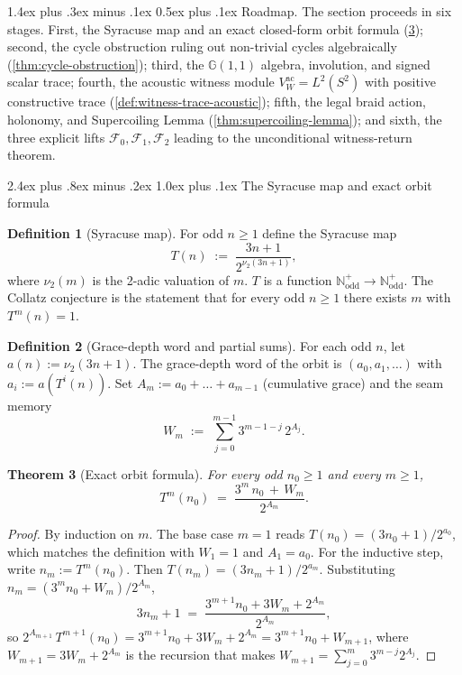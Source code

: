 \documentclass[11pt,a4paper]{article}
\makeatletter
\theoremstyle{plain}
\newtheorem{theorem}{Theorem}[section]
\theoremstyle{definition}
\newtheorem{definition}[theorem]{Definition}
\theoremstyle{remark}
\numberwithin{equation}{section}
\newcommand{\Cl}{\mathbb{G}}
\newcommand{\Nat}{\mathbb{N}}
\renewcommand{\subsection}{%
  \@startsection{subsection}{2}{0pt}%
    {2.4ex plus .8ex minus .2ex}%
    {1.0ex plus .1ex}%
    {\normalfont\Large\bfseries\color{headingAccent}}%
}
\renewcommand{\paragraph}{%
  \@startsection{paragraph}{4}{0pt}%
    {1.4ex plus .3ex minus .1ex}%
    {0.5ex plus .1ex}%
    {\normalfont\normalsize\bfseries\color{headingAccent}}%
}
\makeatother
\begin{document}
\paragraph{Roadmap.}  The section proceeds in six stages.  First,
the Syracuse map and an exact closed-form orbit formula
(\cref{thm:exact-orbit-formula}); second, the cycle obstruction
ruling out non-trivial cycles algebraically
(\cref{thm:cycle-obstruction}); third, the \(\Cl(1,1)\) algebra,
involution, and signed scalar trace; fourth, the acoustic witness
module \(V_W^{\mathrm{ac}}=L^2(S^2)\) with positive constructive
trace (\cref{def:witness-trace-acoustic}); fifth, the legal
braid action, holonomy, and Supercoiling Lemma
(\cref{thm:supercoiling-lemma}); and sixth, the three explicit
lifts \(\mathcal{F}_0,\mathcal{F}_1,\mathcal{F}_2\) leading to the
unconditional witness-return theorem.

\subsection{The Syracuse map and exact orbit formula}

\begin{definition}[Syracuse map]
\label{def:syracuse-map}
For odd $n\ge1$ define the Syracuse map
\[
  T(n)\;:=\;\frac{3n+1}{2^{\nu_2(3n+1)}},
\]
where $\nu_2(m)$ is the 2-adic valuation of $m$.  $T$ is a function
$\Nat^+_{\mathrm{odd}}\to\Nat^+_{\mathrm{odd}}$.  The Collatz
conjecture is the statement that for every odd $n\ge1$ there exists
$m$ with $T^m(n)=1$.
\end{definition}

\begin{definition}[Grace-depth word and partial sums]
\label{def:grace-depth}
For each odd $n$, let $a(n):=\nu_2(3n+1)$.  The grace-depth word of
the orbit is $(a_0,a_1,\dots)$ with $a_i:=a(T^i(n))$.  Set
$A_m:=a_0+\dots+a_{m-1}$ (cumulative grace) and the seam memory
\[
  W_m\;:=\;\sum_{j=0}^{m-1}3^{m-1-j}\,2^{A_j}.
\]
\end{definition}

\begin{theorem}[Exact orbit formula]
\label{thm:exact-orbit-formula}
For every odd $n_0\ge1$ and every $m\ge1$,
\[
  T^m(n_0)\;=\;\frac{3^m\,n_0\,+\,W_m}{2^{A_m}}.
\]
\end{theorem}

\begin{proof}
By induction on $m$.  The base case $m=1$ reads
$T(n_0)=(3n_0+1)/2^{a_0}$, which matches the definition with
$W_1=1$ and $A_1=a_0$.  For the inductive step, write
$n_m:=T^m(n_0)$.  Then $T(n_m)=(3n_m+1)/2^{a_m}$.  Substituting
$n_m=(3^m n_0+W_m)/2^{A_m}$,
\[
  3n_m+1
  \;=\;\frac{3^{m+1}n_0+3W_m+2^{A_m}}{2^{A_m}},
\]
so $2^{A_{m+1}}\,T^{m+1}(n_0)=3^{m+1}n_0+3W_m+2^{A_m}=3^{m+1}n_0+W_{m+1}$,
where $W_{m+1}=3W_m+2^{A_m}$ is the recursion that makes
$W_{m+1}=\sum_{j=0}^m 3^{m-j}2^{A_j}$.
\end{proof}
\end{document}
